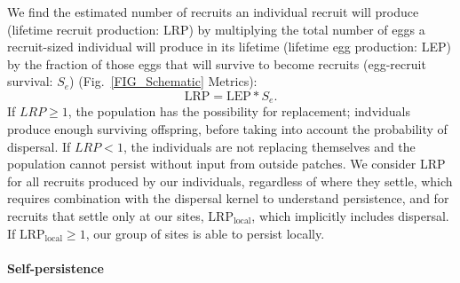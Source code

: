 \documentclass[12pt, oneside]{article}   	%
\begin{document}
We find the estimated number of recruits an individual recruit will produce (lifetime recruit production: LRP) by multiplying the total number of eggs a recruit-sized individual will produce in its lifetime (lifetime egg production: LEP) by the fraction of those eggs that will survive to become recruits (egg-recruit survival: $S_e$) (Fig.\ \ref{FIG_Schematic} Metrics):
\begin{equation}
\text{LRP} = \text{LEP} * S_e. \label{EQN_LRP}
\end{equation}
If $LRP \geq 1$, the population has the possibility for replacement; indviduals produce enough surviving offspring, before taking into account the probability of dispersal. If $LRP < 1$, the individuals are not replacing themselves and the population cannot persist without input from outside patches. We consider LRP for all recruits produced by our individuals, regardless of where they settle, which requires combination with the dispersal kernel to understand persistence, and for recruits that settle only at our sites, $\text{LRP}_\text{local}$, which implicitly includes dispersal. If $\text{LRP}_\text{local} \geq 1$, our group of sites is able to persist locally.  %

\paragraph*{Self-persistence}  %
\end{document}
